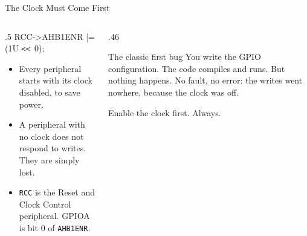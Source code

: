 \documentclass[9pt,aspectratio=169,xcolor=table]{beamer}
\newcommand{\shl}{\texttt{<{}<}}
\begin{document}
\begin{frame}{The Clock Must Come First}
    \begin{columns}[T]
    \begin{column}{.5\textwidth}
        {\ttfamily\normalsize RCC->AHB1ENR |= (1U \shl\ 0);}

        \vspace{3mm}
        \begin{itemize}
            \item Every peripheral starts with its \alert{clock
                  disabled}, to save power.
            \item A peripheral with no clock does not respond to
                  writes. They are simply \alert{lost}.
            \item \texttt{RCC} is the Reset and Clock Control
                  peripheral. GPIOA is bit 0 of \texttt{AHB1ENR}.
        \end{itemize}
    \end{column}
    \begin{column}{.46\textwidth}
        \begin{block}{The classic first bug}
            You write the GPIO configuration. The code compiles and
            runs. But \alert{nothing happens}. No fault, no error: the
            writes went nowhere, because the clock was off.

            \vspace{2mm}
            \alert{Enable the clock first.} Always.
        \end{block}
    \end{column}
    \end{columns}
\end{frame}
\end{document}
